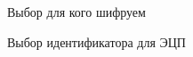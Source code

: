 \documentclass[10pt,a4paper]{report}
\begin{document}
\begin{figure}[h]
	\caption{Выбор для кого шифруем}
	\label{pic:pic8}
\end{figure}	

\begin{figure}[h]
	\caption{Выбор идентификатора для ЭЦП}
	\label{pic:pic9}
\end{figure}	
\end{document}
